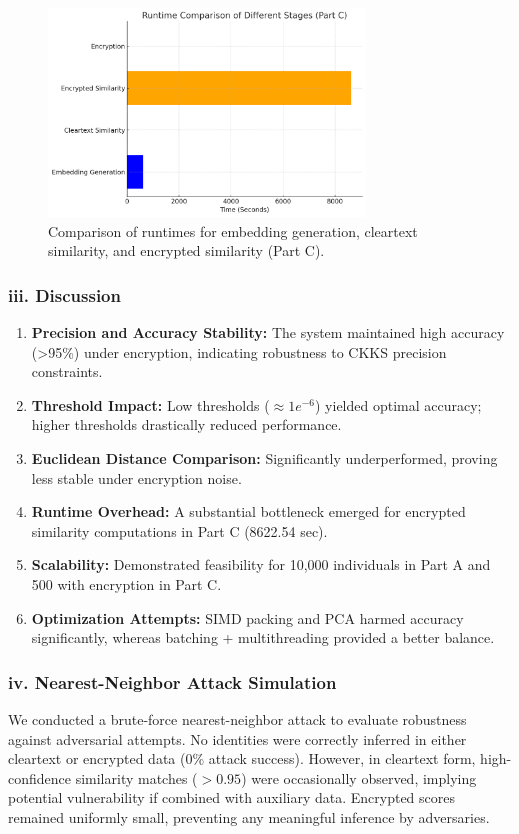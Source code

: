 \documentclass[12pt,a4paper]{article}
\begin{document}
\begin{figure}[H]
    \centering
    \includegraphics[width=0.75\textwidth]{./elements/Runtime Comparison of Different Stages (Part C).png}
    \caption{Comparison of runtimes for embedding generation, cleartext similarity, and encrypted similarity (Part C).}
    \label{fig:runtime_comparison}
\end{figure}

\subsubsection*{iii. Discussion}
\begin{enumerate}
    \item \textbf{Precision and Accuracy Stability:} The system maintained high accuracy (>95\%) under 
    encryption, indicating robustness to CKKS precision constraints.
    \item \textbf{Threshold Impact:} Low thresholds (\(\approx1e^{-6}\)) yielded optimal accuracy; 
    higher thresholds drastically reduced performance.
    \item \textbf{Euclidean Distance Comparison:} Significantly underperformed, proving less stable 
    under encryption noise.
    \item \textbf{Runtime Overhead:} A substantial bottleneck emerged for encrypted similarity 
    computations in Part C (8622.54 sec).
    \item \textbf{Scalability:} Demonstrated feasibility for 10,000 individuals in Part A and 500 
    with encryption in Part C.
    \item \textbf{Optimization Attempts:} SIMD packing and PCA harmed accuracy significantly, 
    whereas batching + multithreading provided a better balance.
\end{enumerate}

\subsubsection*{iv. Nearest-Neighbor Attack Simulation}
We conducted a brute-force nearest-neighbor attack to evaluate robustness against adversarial attempts. 
No identities were correctly inferred in either cleartext or encrypted data (0\% attack success). 
However, in cleartext form, high-confidence similarity matches (\(>0.95\)) were occasionally observed, 
implying potential vulnerability if combined with auxiliary data. Encrypted scores remained uniformly 
small, preventing any meaningful inference by adversaries.
\end{document}
